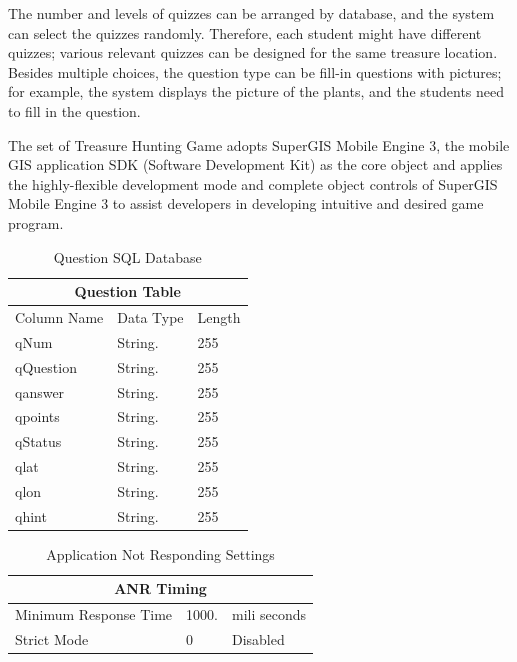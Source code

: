 	The number and levels of quizzes can be arranged by database, and the system can select the quizzes randomly. Therefore, each student might have different quizzes; various relevant quizzes can be designed for the same treasure location. Besides multiple choices, the question type can be fill-in questions with pictures; for example, the system displays the picture of the plants, and the students need to fill in the question.
	
	The set of Treasure Hunting Game adopts SuperGIS Mobile Engine 3, the mobile GIS application SDK (Software Development Kit) as the core object and applies the highly-flexible development mode and complete object controls of SuperGIS Mobile Engine 3 to assist developers in developing intuitive and desired game program.


\begin {table}[H]
\begin{center}
\begin{tabular}{ |l|l|l| }
  \hline
  \multicolumn{3}{|c|}{Question Table} \\
    \hline
  Column Name&Data Type& Length \\
  \hline

qNum&String.&255\\
qQuestion&String.&255\\
qanswer&String.&255\\
qpoints&String.&255\\
qStatus&String.&255\\
qlat&String.&255\\
qlon&String.&255\\
qhint&String.&255\\
  \hline
\end{tabular}
\caption {Question SQL Database} \label{tab:title}
\label{the-label-for-cross-referencing}
\end{center}
\end {table}


\begin {table}[H]
\begin{center}
\begin{tabular}{ |l|l|l| }
  \hline
  \multicolumn{3}{|c|}{ANR Timing} \\
    \hline
  Minimum Response Time &1000.&mili seconds\\
  \hline


Strict Mode & 0 & Disabled \\

  \hline
\end{tabular}
\caption {Application Not Responding Settings} \label{tab:title}
\label{the-label-for-cross-referencing}
\end{center}
\end {table}


